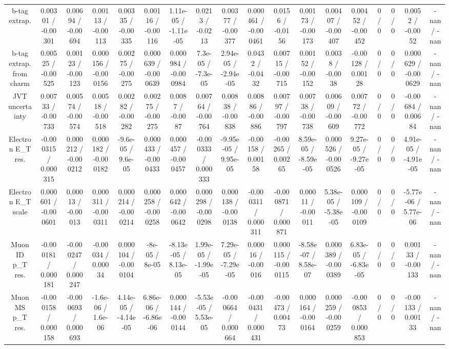 \documentclass[10pt]{article}
\begin{document}
\begin{table}[htbp]
\begin{center}
\begin{tabular}{|c|c|c|c|c|c|c|c|c|c|c|c|c|c|c|c|c|c|}
  b-tag extrap. & 0.00301 / -0.00301 & 0.00694 / -0.00694 & 0.00113 / -0.00113 & 0.00335 / -0.00335 & 0.00116 / -0.00116 & 1.11e-05 / -1.11e-05 & 0.0213 / -0.0213 & 0.00377 / -0.00377 & 0.000461 / -0.000461 & 0.0156 / -0.0156 & 0.00173 / -0.00173 & 0.00407 / -0.00407 & 0.00452 / -0.00452 & 0 / 0 & 0 / 0 & 0.0052 / -0.0052 & -nan / -nan \\ 
  b-tag extrap. from charm & 0.00525 / -0.00525 & 0.00123 / -0.00123 & 0.000156 / -0.000156 & 0.00275 / -0.00275 & 0.000639 / -0.000639 & 0.000984 / -0.000984 & 7.3e-05 / -7.3e-05 & 2.94e-05 / -2.94e-05 & 0.0432 / -0.0432 & 0.00715 / -0.00715 & 0.00152 / -0.00152 & 0.0038 / -0.0038 & -0.00128 / 0.00128 & 0 / 0 & 0 / 0 & 0.000629 / -0.000629 & -nan / -nan \\ 
  JVT uncertainty & 0.00733 / -0.00733 & 0.00574 / -0.00574 & 0.00518 / -0.00518 & 0.00282 / -0.00282 & 0.00275 / -0.00275 & 0.0087 / -0.0087 & 0.00764 / -0.00764 & 0.00838 / -0.00838 & 0.00886 / -0.00886 & 0.00797 / -0.00797 & 0.00738 / -0.00738 & 0.00609 / -0.00609 & 0.00772 / -0.00772 & 0 / 0 & 0 / 0 & -0.00684 / 0.00684 & -nan / -nan \\ 
  Electron E_{T} res. & -0.000315 / 0.000315 & 0.000212 / -0.000212 & 0.000182 / -0.000182 & -9.6e-05 / 9.6e-05 & 0.000433 / -0.000433 & 0.000457 / -0.000457 & -0.000333 / 0.000333 & -9.95e-05 / 9.95e-05 & -0.00158 / 0.00158 & -0.00265 / 0.00265 & 8.59e-05 / -8.59e-05 & 0.000526 / -0.000526 & 9.27e-05 / -9.27e-05 & 0 / 0 & 0 / 0 & 4.91e-05 / -4.91e-05 & -nan / -nan \\ 
  Electron E_{T} scale & 0.000601 / -0.000601 & 0.00013 / -0.00013 & 0.000311 / -0.000311 & 0.000214 / -0.000214 & 0.000258 / -0.000258 & 0.000642 / -0.000642 & 0.000298 / -0.000298 & 0.000138 / -0.000138 & -0.000311 / 0.000311 & -0.000871 / 0.000871 & 0.00011 / -0.00011 & 5.38e-05 / -5.38e-05 & 0.000109 / -0.000109 & 0 / 0 & 0 / 0 & -5.77e-06 / 5.77e-06 & -nan / -nan \\ 
  Muon ID p_{T} res. & -0.000181 / 0.000181 & -0.000247 / 0.000247 & -0.00034 / 0.00034 & 0.000104 / -0.000104 & -8e-05 / 8e-05 & -8.13e-05 / 8.13e-05 & 1.99e-05 / -1.99e-05 & 7.29e-05 / -7.29e-05 & 0.00016 / -0.00016 & 0.000115 / -0.000115 & -8.58e-07 / 8.58e-07 & 0.000389 / -0.000389 & 6.83e-05 / -6.83e-05 & 0 / 0 & 0 / 0 & 0.00133 / -0.00133 & -nan / -nan \\ 
  Muon MS p_{T} res. & -0.000158 / 0.000158 & -0.000693 / 0.000693 & -1.6e-06 / 1.6e-06 & 4.14e-05 / -4.14e-05 & 6.86e-06 / -6.86e-06 & 0.000144 / -0.000144 & -5.53e-05 / 5.53e-05 & -0.000664 / 0.000664 & -0.000431 / 0.000431 & -0.00473 / 0.00473 & 0.000164 / -0.000164 & 0.000259 / -0.000259 & -0.000853 / 0.000853 & 0 / 0 & 0 / 0 & -0.00133 / 0.00133 & -nan / -nan \\ 

\end{tabular}
\end{center}
\end{table}
\end{document}
